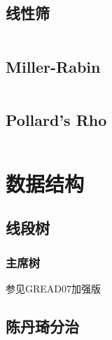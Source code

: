 \documentclass[a4paper]{article}
\begin{document}
\begin{multicols}{2}
			\subsection{线性筛}
				\inputminted{cpp}{../src/数论/扩展线性筛.cpp}



			\subsection{Miller-Rabin}
				\inputminted{cpp}{../src/数论/Miller-Rabin.cpp}

			\subsection{Pollard's Rho}
				\inputminted{cpp}{../src/数论/Pollard's Rho.cpp}
			


				

		\section{数据结构}

			\subsection{线段树}

				\subsubsection{主席树}
					参见GREAD07加强版

			\subsection{陈丹琦分治}
				\inputminted{cpp}{../src/数据结构/CDQ分治.cpp}


\end{multicols}
\end{document}
